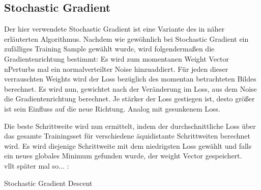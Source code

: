 \subsection{Stochastic Gradient}

Der hier verwendete Stochastic Gradient ist eine Variante des in \cite{NowozinStrucLearn11} näher erläuterten Algorithmus. Nachdem wie gewöhnlich bei Stochastic Gradient ein zufälliges Training Sample gewählt wurde, wird folgendermaßen die Gradientenrichtung bestimmt: Es wird zum momentanen Weight Vector nPerturbs mal ein normalverteilter Noise hinzuaddiert. Für jeden dieser verrauschten Weights wird der Loss bezüglich des momentan betrachteten Bildes berechnet. 
Es wird nun, gewichtet nach der Veränderung im Loss, aus dem Noise die Gradientenrichtung berechnet. Je stärker der Loss gestiegen ist, desto größer ist sein Einfluss auf die neue Richtung. Analog mit gesunkenem Loss.

Die beste Schrittweite wird nun ermittelt, indem der durchschnittliche Loss über das gesamte Trainingsset für verschiedene äquidistante Schrittweiten berechnet wird. Es wird diejenige Schrittweite mit dem niedrigsten Loss gewählt und falls ein neues globales Minimum gefunden wurde, der weight Vector gespeichert. \\

vllt später mal so... :
\begin{algorithm}
\caption{Stochastic Gradient Descent}\label{sgd}
\begin{algorithmic}[1]
\EndProcedure
\end{algorithmic}
\end{algorithm}









